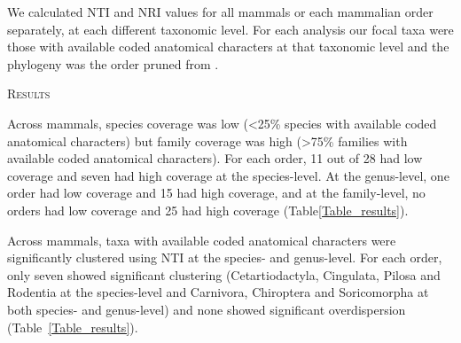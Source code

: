 \documentclass[12pt,letterpaper]{article}
\renewcommand{\section}[1]{%
\bigskip
\begin{center}
\begin{Large}
\normalfont\scshape #1
\medskip
\end{Large}
\end{center}}
\begin{document}
We calculated NTI and NRI values for all mammals or each mammalian order separately, at each different taxonomic level. 
For each analysis our focal taxa were those with available coded anatomical characters at that taxonomic level and the phylogeny was the order pruned from \cite{BinindaEmonds}.

%
%


\section{Results}
Across mammals, species coverage was low (\textless 25\% species with available coded anatomical characters) but family coverage was high (\textgreater 75\% families with available coded anatomical characters).
For each order, 11 out of 28 had low coverage and seven had high coverage at the species-level.
At the genus-level, one order had low coverage and 15 had high coverage, and at the family-level, no orders had low coverage and 25 had high coverage (Table\ref{Table_results}).






Across mammals, taxa with available coded anatomical characters were significantly clustered using NTI at the species- and genus-level.
For each order, only seven showed significant clustering (Cetartiodactyla, Cingulata, Pilosa and Rodentia at the species-level and Carnivora, Chiroptera and Soricomorpha at both species- and genus-level) and none showed significant overdispersion (Table~\ref{Table_results}).
\end{document}
